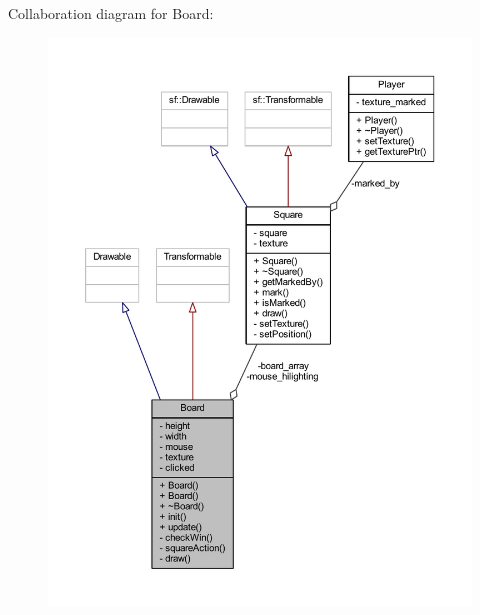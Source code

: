 Collaboration diagram for Board\+:
\nopagebreak
\begin{figure}[H]
\begin{center}
\leavevmode
\includegraphics[width=350pt]{class_board__coll__graph}
\end{center}
\end{figure}
